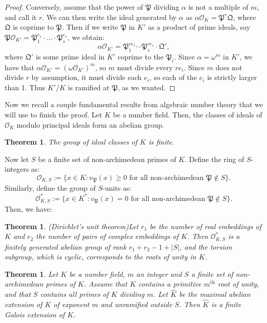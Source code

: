 \documentclass[a4paper, 12pt]{amsart}
\theoremstyle{definition}
\theoremstyle{plain}
\theoremstyle{plain}
\newtheorem{thm0}[defn0]{Theorem}
\theoremstyle{plain}
\theoremstyle{plain}
\theoremstyle{remark}
\theoremstyle{remark}
\theoremstyle{plain}
\newenvironment{theorem}{ \begin{thm0}}{\end{thm0}}
\renewcommand{\P}{\mathfrak{P}}
\begin{document}
\begin{proof}
		Conversely, assume that the power of $\P$ dividing $\alpha$ is not a multiple of $m$, and call it $r$. We can then write the ideal generated by $\alpha$ as $\alpha\mathcal{O}_K=\P^r\mathfrak{Q}$, where $\mathfrak{Q}$ is coprime to $\P$. Then if we write $\P$ in $K'$ as a product of prime ideals, say $\P\mathcal{O}_{K'}=\P_1^{e_1}\cdot\ldots\cdot\P_s^{e_s}$, we obtain:
		\begin{equation*}
			\alpha\mathcal{O}_{K'}=\P_1^{re_1}\cdots\P_s^{re_s}\cdot\mathfrak{Q}',
		\end{equation*}
		where $\mathfrak{Q}'$ is some prime ideal in $K'$ coprime to the $\P_i$. Since $\alpha=\omega^m$ in $K'$, we have that $\alpha\mathcal{O}_{K'}=(\omega\mathcal{O}_{K'})^m$, so $m$ must divide every $re_i$. Since $m$ does not divide $r$ by assumption, it must divide each $e_i$, so each of the $e_i$ is strictly larger than 1. Thus $K'/K$ is ramified at $\P$, as we wanted.
	\end{proof}
	Now we recall a couple fundamental results from algebraic number theory that we will use to finish the proof. Let $K$ be a number field. Then, the classes of ideals of $\mathcal{O}_K$ modulo principal ideals form an abelian group.
	\begin{theorem}\label{finiteidealclasses}
		The group of ideal classes of $K$ is finite.
	\end{theorem}
	Now let $S$ be a finite set of non-archimedean primes of $K$. Define the ring of $S$-integers as:
	\begin{equation*}
		\mathcal{O}_{K,S}:=\{x\in K: v_\P(x)\ge 0\text{ for all non-archimedean } \P\not\in S\}.
	\end{equation*}
	Similarly, define the group of $S$-units as:
	\begin{equation*}
		\mathcal{O}_{K,S}^*:=\{x\in K^*: v_\P(x)=0\text{ for all non-archimedean } \P\not\in S\}.
	\end{equation*}
	Then, we have:
	\begin{theorem}(Dirichlet's unit theorem)\label{dirichletunit}
		Let $r_1$ be the number of real embeddings of $K$ and $r_2$ the number of pairs of complex embeddings of $K$. Then $\mathcal{O}_{K,S}^*$ is a finitely generated abelian group of rank $r_1+r_2-1+|S|$, and the torsion subgroup, which is cyclic, corresponds to the roots of unity in $K$.
	\end{theorem}
	\begin{theorem}\label{maxabextension}
		Let $K$ be a number field, $m$ an integer and $S$ a finite set of non-archimedean primes of $K$. Assume that $K$ contains a primitive $m^{\text{th}}$ root of unity, and that $S$ contains all primes of $K$ dividing $m$. Let $\hat{K}$ be the maximal abelian extension of $K$ of exponent $m$ and unramified outside $S$. Then $\hat{K}$ is a finite Galois extension of $K$.
	\end{theorem}
\end{document}
